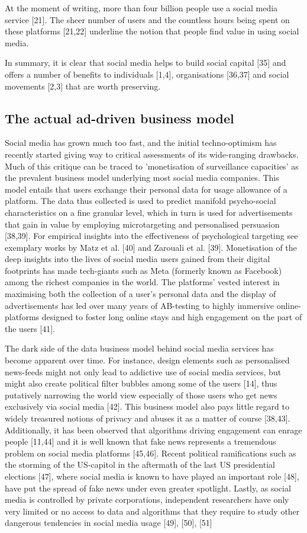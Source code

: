 \documentclass{sistedes}
\begin{document}
At the moment of writing, more than four billion people use a social media service [21]. The sheer number of users and the countless hours being spent on these platforms [21,22] underline the notion that people find value in using social media.

In summary, it is clear that social media helps to build social capital [35] and offers a number of benefits to individuals [1,4], organisations [36,37] and social movements [2,3] that are worth preserving.

\subsection{The actual ad-driven business model}
Social media has grown much too fast, and the initial techno-optimism has recently started giving way to critical assessments of its wide-ranging drawbacks. Much of this critique can be traced to 'monetisation of surveillance capacities' \cite{monetizationOfSurveillandeCapacitiesModel} as the prevalent business model underlying most social media companies. This model entails that users exchange their personal data for usage allowance of a platform. The data thus collected is used to predict manifold psycho-social characteristics on a fine granular level, which in turn is used for advertisements that gain in value by employing microtargeting and personalised persuasion [38,39]. For empirical insights into the effectiveness of psychological targeting see exemplary works by Matz et al. [40] and Zarouali et al. [39]. Monetisation of the deep insights into the lives of social media users gained from their digital footprints has made tech-giants such as Meta (formerly known as Facebook) among the richest companies in the world. The platforms’ vested interest in maximising both the collection of a user's personal data and the display of advertisements has led over many years of AB-testing to highly immersive online-platforms designed to foster long online stays and high engagement on the part of the users [41].

The dark side of the data business model behind social media services has become apparent over time. For instance, design elements such as personalised news-feeds might not only lead to addictive use of social media services, but might also create political filter bubbles among some of the users [14], thus putatively narrowing the world view especially of those users who get news exclusively via social media [42]. This business model also pays little regard to widely treasured notions of privacy and abuses it as a matter of course [38,43]. Additionally, it has been observed that algorithms driving engagement can enrage people [11,44] and it is well known that fake news represents a tremendous problem on social media platforms [45,46]. Recent political ramifications such as the storming of the US-capitol in the aftermath of the last US presidential elections [47], where social media is known to have played an important role [48], have put the spread of fake news under even greater spotlight. Lastly, as social media is controlled by private corporations, independent researchers have only very limited or no access to data and algorithms that they require to study other dangerous tendencies in social media usage [49], [50], [51]
\end{document}
